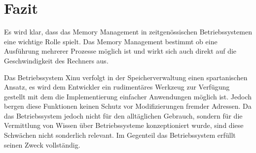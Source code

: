 \section{Fazit}
\label{sec:Fazit}
Es wird klar, dass das Memory Management in zeitgenössischen Betriebssystemen eine wichtige Rolle spielt. Das Memory Management bestimmt ob eine Ausführung mehrerer Prozesse möglich ist und wirkt sich auch direkt auf die Geschwindigkeit des Rechners aus. 

Das Betriebssystem Xinu verfolgt in der Speicherverwaltung einen spartanischen Ansatz, es wird dem Entwickler ein rudimentäres Werkzeug zur Verfügung gestellt mit dem die Implementierung einfacher Anwendungen möglich ist. Jedoch bergen diese Funktionen keinen Schutz vor Modifizierungen fremder Adressen. Da das Betriebssystem jedoch nicht für den alltäglichen Gebrauch, sondern für die Vermittlung von Wissen über Betriebssysteme konzeptioniert wurde, sind diese Schwächen nicht sonderlich relevant. Im Gegenteil das Betriebssystem erfüllt seinen Zweck vollständig.
